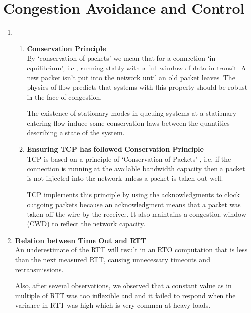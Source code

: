 \documentclass[12pt]{article}
\begin{document}
\maketitle

\section{Congestion Avoidance and Control}
\begin{enumerate}

    \item 
    \begin{enumerate}[label=(\alph*)]
    
    \item \textbf{Conservation Principle} \\
By ‘conservation of packets’ we mean that for a connection ‘in equilibrium’, i.e., running stably with a full window
of data in transit. A new packet isn’t put into the network
until an old packet leaves. The physics of flow predicts that
systems with this property should be robust in the face of
congestion.

The existence of stationary modes in queuing systems at a stationary entering
flow induce some conservation laws between the quantities describing a state of the system.
    
    \item \textbf{Ensuring TCP has followed Conservation Principle} \\
    TCP is based on a principle of ‘Conservation of Packets’ , i.e. if the connection is running at the available bandwidth capacity then a packet is not injected into the network unless a packet is taken out well.
    
    TCP implements this principle by using the acknowledgments to clock outgoing packets because an acknowledgment means that a packet was taken off the wire by the receiver. It also maintains a congestion window (CWD) to reflect the network capacity. 

\end{enumerate} %
    
    \item \textbf{Relation between Time Out and RTT} \\
    An underestimate of the RTT will result in an RTO computation that is less than the next measured RTT, causing unnecessary timeouts and retransmissions.
    
    Also, after several observations, we observed that a constant value as in multiple of RTT was too inflexible and and it failed to respond when the variance in RTT was high which is very common at heavy loads.
    

\end{enumerate}
\end{document}
